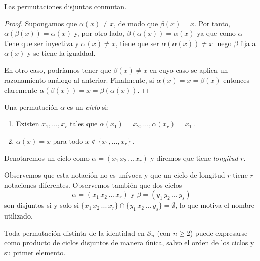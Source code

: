 \begin{nprop} 
Las permutaciones disjuntas conmutan.
\end{nprop}
\begin{proof}
Supongamos que $	\alpha(x) \neq x$, de modo que $\beta(x) = x$. Por tanto, $\alpha(\beta(x)) = \alpha(x)$ y, por otro lado, $\beta(\alpha(x)) = \alpha(x)$ ya que como $\alpha$ tiene que ser inyectiva y $\alpha(x) \neq x$, tiene que ser $\alpha(\alpha(x)) \neq x$ luego $\beta$ fija a $\alpha(x)$ y se tiene la igualdad.

En otro caso, podríamos tener que $\beta(x) \neq x$ en cuyo caso se aplica un razonamiento análogo al anterior. Finalmente, si $\alpha(x) = x = \beta(x)$ entonces claremente $\alpha(\beta(x)) = x = \beta(\alpha(x))$.
\end{proof}

\begin{ndef}[Ciclo]

Una permutación $\alpha$ es un \textit{ciclo} si: \begin{enumerate}
  \item Existen $x_1, \dots, x_r$ tales que $\alpha(x_1) = x_2, \hdots, \alpha(x_r) = x_1$\,.
  \item $\alpha(x) = x$ para todo $x \notin \{x_1,\hdots,x_r\}$\,.
\end{enumerate}

Denotaremos un ciclo como  $\alpha = (x_1 \, x_2 \, \hdots \, x_r)$ y diremos que tiene \textit{longitud} $r$.
\end{ndef}

Observemos que esta notación no es unívoca y que un ciclo de longitud $r$ tiene $r$ notaciones diferentes. Observemos también que dos ciclos \begin{equation*}
  \alpha = (x_1 \, x_2 \, ... \, x_r) \text{ y } \beta = (y_1 \, y_2 \, ... \, y_s)
\end{equation*}son disjuntos si y solo si $\{x_1 \, x_2 \, ... \, x_r \} \cap \{y_1 \, x_2 \, ... \, y_s \} = \emptyset$, lo que motiva el nombre utilizado.

\begin{nth}
Toda permutación distinta de la identidad en $\mathcal S_n$ (con $n \ge 2$) puede expresarse como producto de ciclos disjuntos de manera única, salvo el orden de los ciclos y su primer elemento.
\end{nth}

